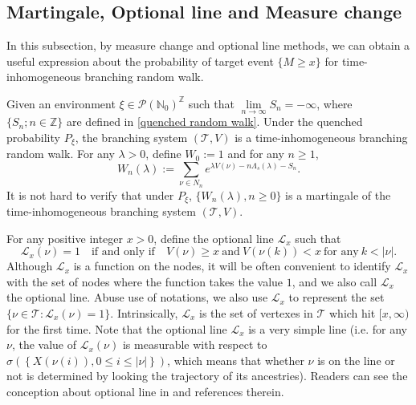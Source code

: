 \documentclass[]{article}
\numberwithin{equation}{section}
\theoremstyle{thmstyleone}%
\theoremstyle{thmstyletwo}%
\theoremstyle{thmstylethree}%
\theoremstyle{thmstylefour}%
\theoremstyle{thmstylefive}%
\theoremstyle{thmstylesix}%
\newcommand{\N}{\mathbb{N}}
\begin{document}
	
	
	\subsection{Martingale, Optional line and Measure change}\label{Section2.2}
	
	In this subsection, by measure change and optional line methods,  we can obtain a useful expression about the probability of target event $\{M\geqslant x\}$ for time-inhomogeneous branching random walk.
	
	Given an environment $\xi \in \mathcal{P}\left(\N_0\right)^{\mathbb{Z}}$ such that $\lim\limits_{n\rightarrow\infty} S_n=-\infty$, where  $\{S_n;n\in \mathbb{Z}\}$ are defined in \cref{quenched random walk}.
	Under the quenched probability $P_\xi$,
	the branching system $(\mathcal{T},V)$ is a time-inhomogeneous branching random walk. For any $\lambda>0$, define $W_0:=1$ and for any $n\geqslant 1$,
	\begin{equation}\label{additive martingale}
		W_n(\lambda):= \sum_{\nu\in N_n} e^{\lambda V\left(\nu\right)-n\Lambda_s(\lambda)-S_{n}}.
	\end{equation}
	It is not hard to verify that under $P_\xi$, $\{W_n(\lambda),n\geqslant0\}$ is a martingale of the time-inhomogeneous branching system $(\mathcal{T},V)$. 
	
	For any positive integer $x>0$, define the optional line $\mathcal{L}_x$ such that
	\begin{equation}\label{Def of Ln}
		\mathcal{L}_x(\nu)=1 \quad \text{if and only if} \quad 
		V(\nu)\geqslant x ~ \text{and} ~V(\nu(k))<x ~\text{for any}~ k<|\nu|.
	\end{equation}
	Although $\mathcal{L}_x$ is a function on the nodes, it will be often convenient to identify $\mathcal{L}_x$ with the set of nodes where the function takes the value $1$, and we also call $\mathcal{L}_x$ the optional line. Abuse use of notations, we also use $\mathcal{L}_x$ to represent the set $\{\nu\in \mathcal{T} :\mathcal{L}_x(\nu) = 1\}$. 
	Intrinsically, $\mathcal{L}_x$ is the set of vertexes in $\mathcal{T}$ which hit $[x,\infty)$ for the first time.
	Note that the optional line $\mathcal{L}_x$ is a very simple line 
	(i.e. for any $\nu$, the value of $\mathcal{L}_x(\nu)$ is measurable with respect to $\sigma\left(\left\{X(\nu(i)),0\leqslant i \leqslant |\nu|\right\}\right)$, which means that whether $\nu$ is on the line or not is determined by looking the trajectory of its ancestries).
	Readers can see the conception about optional line in \cite{Biggins2004} and references therein.
	
\end{document}
